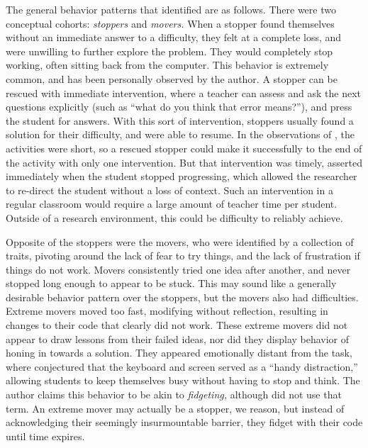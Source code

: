 The general behavior patterns that \citet{perkins-1986} identified are as follows. There were two conceptual cohorts: \emph{stoppers} and \emph{movers.} When a stopper found themselves without an immediate answer to a difficulty, they felt at a complete loss, and were unwilling to further explore the problem. They would completely stop working, often sitting back from the computer. This behavior is extremely common, and has been personally observed by the author. A stopper can be rescued with immediate intervention, where a teacher can assess and ask the next questions explicitly (such as ``what do you think that error means?''), and press the student for answers. With this sort of intervention, stoppers usually found a solution for their difficulty, and were able to resume. In the observations of \citeauthor{perkins-1986}, the activities were short, so a rescued stopper could make it successfully to the end of the activity with only one intervention. But that intervention was timely, asserted immediately when the student stopped progressing, which allowed the researcher to re-direct the student without a loss of context. Such an intervention in a regular classroom would require a large amount of teacher time per student. Outside of a research environment, this could be difficulty to reliably achieve.

Opposite of the stoppers were the movers, who were identified by a collection of traits, pivoting around the lack of fear to try things, and the lack of frustration if things do not work. Movers consistently tried one idea after another, and never stopped long enough to appear to be stuck. This may sound like a generally desirable behavior pattern over the stoppers, but the movers also had difficulties. Extreme movers moved too fast, modifying without reflection, resulting in changes to their code that clearly did not work. These extreme movers did not appear to draw lessons from their failed ideas, nor did they display behavior of honing in towards a solution. They appeared emotionally distant from the task, where \citeauthor{perkins-1986} conjectured that the keyboard and screen served as a ``handy distraction,'' allowing students to keep themselves busy without having to stop and think. The author claims this behavior to be akin to \emph{fidgeting,} although \citeauthor{perkins-1986} did not use that term. An extreme mover may actually be a stopper, we reason, but instead of acknowledging their seemingly insurmountable barrier, they fidget with their code until time expires.

